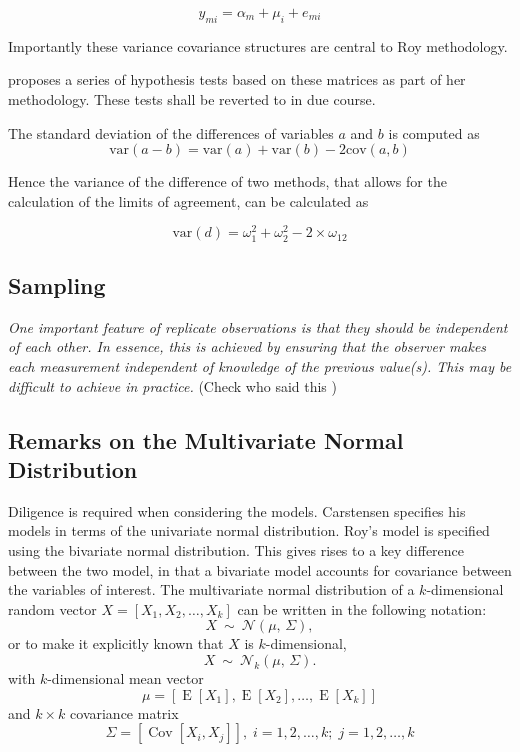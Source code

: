 \documentclass[12pt, a4paper]{report}
\theoremstyle{plain}
\theoremstyle{definition}
\theoremstyle{remark}
\begin{document}
\[ y_{mi} =  \alpha_{m}  + \mu_{i} + e_{mi}  \]

\newpage



Importantly these variance covariance structures are central to Roy methodology.


\citet{Roy} proposes a series of hypothesis tests based on these matrices as part of her methodology. These tests shall be reverted to in due course.

The standard deviation of the differences of variables $a$ and $b$ is computed as
\[
\mbox{var}(a - b) = \mbox{var} ( a )  + \mbox{var} ( b ) - 2\mbox{cov} ( a ,b )
\]

Hence the variance of the difference of two methods, that allows for the calculation of the limits of agreement, can be calculated as

\[
\mbox{var}(d) = \omega^2_1  + \omega^2_2 - 2 \times \omega_12
\]







\newpage


\subsection{Sampling}
	\emph{
		One important feature of replicate observations is that they should be independent
		of each other. In essence, this is achieved by ensuring that the observer makes each
		measurement independent of knowledge of the previous value(s). This may be difficult
		to achieve in practice.} (Check who said this
	)
	


\newpage

\subsection{Remarks on the Multivariate Normal Distribution}

Diligence is required when considering the models. Carstensen specifies his models in terms of the univariate normal distribution. Roy's model is specified using the bivariate normal distribution.
This gives rises to a key difference between the two model, in that a bivariate model accounts for covariance between the variables of interest.
The multivariate normal distribution of a $k$-dimensional random vector $X = [X_1, X_2, \ldots, X_k]$
can be written in the following notation:
\[
X\ \sim\ \mathcal{N}(\mu,\, \Sigma),
\]
or to make it explicitly known that $X$ is $k$-dimensional,
\[
X\ \sim\ \mathcal{N}_k(\mu,\, \Sigma).
\]
with $k$-dimensional mean vector
\[ \mu = [ \operatorname{E}[X_1], \operatorname{E}[X_2], \ldots, \operatorname{E}[X_k]] \]
and $k \times k$ covariance matrix
\[ \Sigma = [\operatorname{Cov}[X_i, X_j]], \; i=1,2,\ldots,k; \; j=1,2,\ldots,k \]
\end{document}

